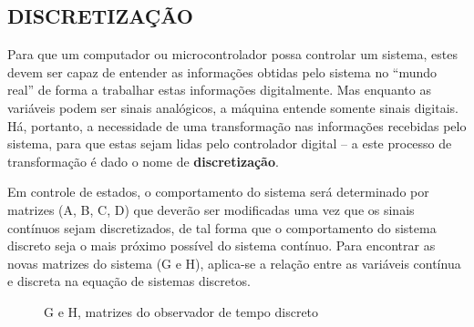 \documentclass[a4paper,12pt]{article}
\begin{document}
\subsection{DISCRETIZAÇÃO}
\hspace{4ex}Para que um computador ou microcontrolador possa controlar um sistema, estes devem ser capaz de entender as informações obtidas pelo sistema no “mundo real” de forma a trabalhar estas informações digitalmente. Mas enquanto as variáveis podem ser sinais analógicos, a máquina entende somente sinais digitais. Há, portanto, a necessidade de uma transformação nas informações recebidas pelo sistema, para que estas sejam lidas pelo controlador digital – a este processo de transformação é dado o nome de {\bf discretização}.

Em controle de estados, o comportamento do sistema será determinado por matrizes (A, B, C, D) que deverão ser modificadas uma vez que os sinais contínuos sejam discretizados, de tal forma que o comportamento do sistema discreto seja o mais próximo possível do sistema contínuo. Para encontrar as novas matrizes do sistema (G e H), aplica-se a relação entre as variáveis contínua e discreta na equação de sistemas discretos.

\begin{figure}[H]
     \centering
\hspace{1cm}
\hspace{1cm}
\hspace{1cm}
     \caption{G e H, matrizes do observador de tempo discreto}
     \label{fig:G_H}
\end{figure}
\end{document}
